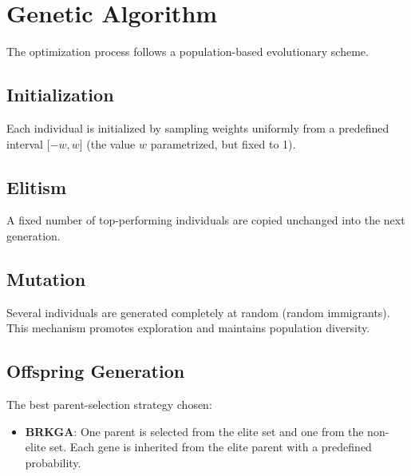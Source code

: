 \documentclass[11pt,a4paper]{article}
\begin{document}
\section{Genetic Algorithm}

The optimization process follows a population-based evolutionary scheme.

\subsection{Initialization}

Each individual is initialized by sampling weights uniformly from a predefined interval [$-w, w$] (the value $w$ parametrized, but fixed to 1).

\subsection{Elitism}

A fixed number of top-performing individuals are copied unchanged into the next generation.

\subsection{Mutation}

Several individuals are generated completely at random (random immigrants). This mechanism promotes exploration and maintains population diversity.

\subsection{Offspring Generation}

The best parent-selection strategy chosen:

\begin{itemize}
    \item \textbf{BRKGA}: One parent is selected from the elite set and one from the non-elite set. Each gene is inherited from the elite parent with a predefined probability.
\end{itemize}
\end{document}
